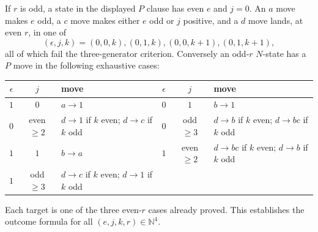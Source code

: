 \documentclass[11pt]{article}
\theoremstyle{definition}
\theoremstyle{remark}
\newcommand{\N}{\mathbb N}
\begin{document}
If $r$ is odd, a state in the displayed $P$ clause has even $e$ and $j=0$.
An $a$ move makes $e$ odd, a $c$ move makes either $e$ odd or $j$ positive,
and a $d$ move lands, at even $r$, in one of
\[
 (\epsilon,j,k)=(0,0,k),(0,1,k),(0,0,k+1),(0,1,k+1),
\]
all of which fail the three-generator criterion.  Conversely an odd-$r$
$N$-state has a $P$ move in the following exhaustive cases:
\begin{center}
\small
\begin{tabular}{ccl@{\qquad}ccl}
\toprule
$\epsilon$&$j$&move&$\epsilon$&$j$&move\\
\midrule
$1$&$0$&$a\to1$&$0$&$1$&$b\to1$\\
$0$&even $\ge2$&$d\to1$ if $k$ even; $d\to c$ if $k$ odd
 &$0$&odd $\ge3$&$d\to b$ if $k$ even; $d\to bc$ if $k$ odd\\
$1$&$1$&$b\to a$
 &$1$&even $\ge2$&$d\to bc$ if $k$ even; $d\to b$ if $k$ odd\\
$1$&odd $\ge3$&$d\to c$ if $k$ even; $d\to1$ if $k$ odd&&&\\
\bottomrule
\end{tabular}
\end{center}
Each target is one of the three even-$r$ cases already proved.  This
establishes the outcome formula for all $(e,j,k,r)\in\N^4$.
\end{document}
